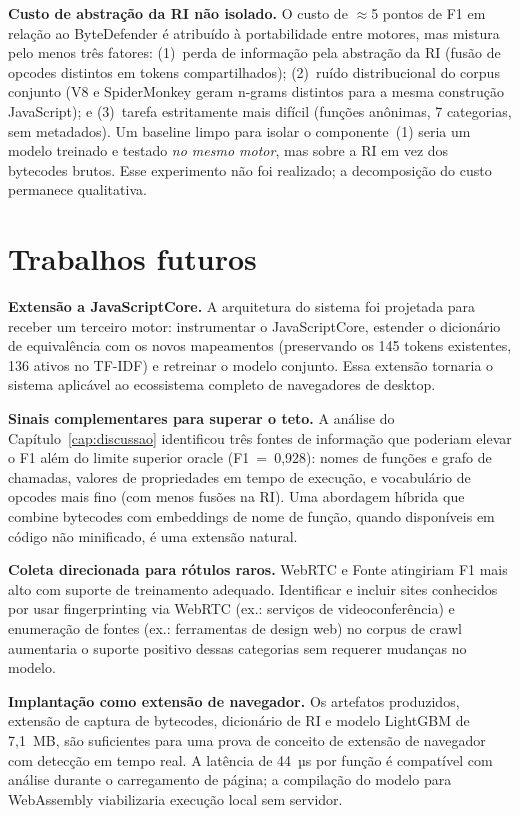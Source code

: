 \textbf{Custo de abstração da RI não isolado.} O custo de $\approx$5 pontos de
F1 em relação ao ByteDefender é atribuído à portabilidade entre motores, mas
mistura pelo menos três fatores: (1)~perda de informação pela abstração da RI
(fusão de opcodes distintos em tokens compartilhados); (2)~ruído distribucional
do corpus conjunto (V8 e SpiderMonkey geram n-grams distintos para a mesma
construção JavaScript); e (3)~tarefa estritamente mais difícil (funções
anônimas, 7 categorias, sem metadados). Um baseline limpo para isolar o
componente~(1) seria um modelo treinado e testado \emph{no mesmo motor}, mas
sobre a RI em vez dos bytecodes brutos. Esse experimento não foi realizado; a
decomposição do custo permanece qualitativa.

\section{Trabalhos futuros}
\label{sec:conclusao-futuros}

\textbf{Extensão a JavaScriptCore.} A arquitetura do sistema foi projetada para
receber um terceiro motor: instrumentar o JavaScriptCore, estender o dicionário de
equivalência com os novos mapeamentos (preservando os 145 tokens existentes, 136 ativos no TF-IDF) e
retreinar o modelo conjunto. Essa extensão tornaria o sistema aplicável ao
ecossistema completo de navegadores de desktop.

\textbf{Sinais complementares para superar o teto.} A análise do
Capítulo~\ref{cap:discussao} identificou três fontes de informação que poderiam
elevar o F1 além do limite superior oracle (F1~=~0,928): nomes de funções e grafo
de chamadas, valores de propriedades em tempo de execução, e vocabulário de opcodes
mais fino (com menos fusões na RI). Uma abordagem híbrida que combine bytecodes com embeddings de nome
de função, quando disponíveis em código não minificado, é uma extensão natural.

\textbf{Coleta direcionada para rótulos raros.} WebRTC e Fonte atingiriam F1 mais
alto com suporte de treinamento adequado. Identificar e incluir sites conhecidos
por usar fingerprinting via WebRTC (ex.: serviços de videoconferência) e
enumeração de fontes (ex.: ferramentas de design web) no corpus de crawl
aumentaria o suporte positivo dessas categorias sem requerer mudanças no modelo.

\textbf{Implantação como extensão de navegador.} Os artefatos produzidos, extensão de captura de bytecodes, dicionário de RI e modelo LightGBM de 7,1~MB, são suficientes para uma prova de conceito de extensão de navegador com detecção em
tempo real. A latência de 44~µs por função é compatível com análise durante o
carregamento de página; a compilação do modelo para WebAssembly viabilizaria
execução local sem servidor.

